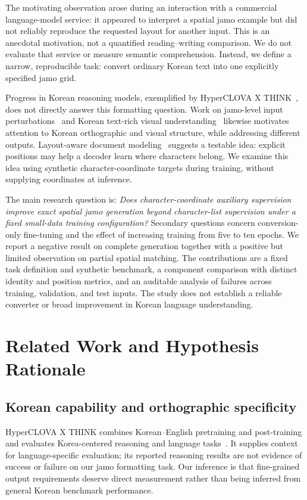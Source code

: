 \documentclass[journal]{IEEEtran}
\begin{document}
The motivating observation arose during an interaction with a commercial language-model service: it appeared to interpret a spatial jamo example but did not reliably reproduce the requested layout for another input. This is an anecdotal motivation, not a quantified reading--writing comparison. We do not evaluate that service or measure semantic comprehension. Instead, we define a narrow, reproducible task: convert ordinary Korean text into one explicitly specified jamo grid.

Progress in Korean reasoning models, exemplified by HyperCLOVA X THINK~\cite{naver2025think}, does not directly answer this formatting question. Work on jamo-level input perturbations~\cite{lee2026jamo} and Korean text-rich visual understanding~\cite{hwang2025kreta} likewise motivates attention to Korean orthographic and visual structure, while addressing different outputs. Layout-aware document modeling~\cite{lu2025bounding} suggests a testable idea: explicit positions may help a decoder learn where characters belong. We examine this idea using synthetic character-coordinate targets during training, without supplying coordinates at inference.

The main research question is: \emph{Does character-coordinate auxiliary supervision improve exact spatial jamo generation beyond character-list supervision under a fixed small-data training configuration?} Secondary questions concern conversion-only fine-tuning and the effect of increasing training from five to ten epochs. We report a negative result on complete generation together with a positive but limited observation on partial spatial matching. The contributions are a fixed task definition and synthetic benchmark, a component comparison with distinct identity and position metrics, and an auditable analysis of failures across training, validation, and test inputs. The study does not establish a reliable converter or broad improvement in Korean language understanding.

\section{Related Work and Hypothesis Rationale}
\subsection{Korean capability and orthographic specificity}
HyperCLOVA X THINK combines Korean--English pretraining and post-training and evaluates Korea-centered reasoning and language tasks~\cite{naver2025think}. It supplies context for language-specific evaluation; its reported reasoning results are not evidence of success or failure on our jamo formatting task. Our inference is that fine-grained output requirements deserve direct measurement rather than being inferred from general Korean benchmark performance.
\end{document}
